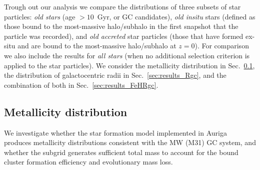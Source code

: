 \documentclass[a4paper,fleqn,usenatbib]{mnras}
\begin{document}
Trough out our analysis we compare the distributions of three subsets of star 
particles: \emph{old stars} (age $>10$~Gyr, or GC candidates), \emph{old insitu} 
stars (defined as those bound to the most-massive halo/subhalo in the first
snapshot that the particle was recorded), and \emph{old accreted} star particles 
(those that have formed ex-situ and are bound to the most-massive halo/subhalo
at $z=0$). For comparison we also include the results for \emph{all stars} (when
no additional selection criterion is applied to the star particles). We consider 
the metallicity distribution in Sec.~\ref{sec:results_FeH}, the distribution of 
galactocentric radii in Sec.~\ref{sec:results_Rgc}, and the combination of both 
in Sec.~\ref{sec:results_FeHRgc}.


\subsection{Metallicity distribution}
\label{sec:results_FeH}
We investigate whether the star formation model implemented in Auriga produces 
metallicity distributions consistent with the MW (M31) GC system, and whether 
the subgrid generates sufficient total mass to account for the bound cluster 
formation efficiency and evolutionary mass loss.
\end{document}
